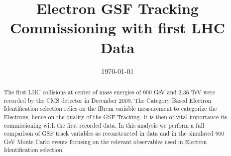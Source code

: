 \documentclass{cmspaper}
\begin{document}
\begin{titlepage}
\date{\today}
\title{Electron GSF Tracking Commissioning with first LHC Data}
\begin{Authlist}

 

\end{Authlist}
\begin{abstract}
The first LHC collisions at center of mass energies of 900 GeV and 2.36 TeV were recorded by the CMS
detector in December 2009. 
The Category Based Electron Identification selection relies on the
fBrem variable measurement to categorize the Electrons, hence on the
quality of the GSF Tracking.
It is then of vital importance its commissioning with the first
recorded data.
In this analysis we perform a full comparison of GSF track variables as reconstructed in data and 
in the simulated 900 GeV Monte Carlo events focusing on the relevant
observables used in Electron Identification selection.

\end{abstract}                          

\end{titlepage}

\clearpage 
\tableofcontents
\clearpage

\linenumbers

\newpage




\pagebreak
\end{document}
